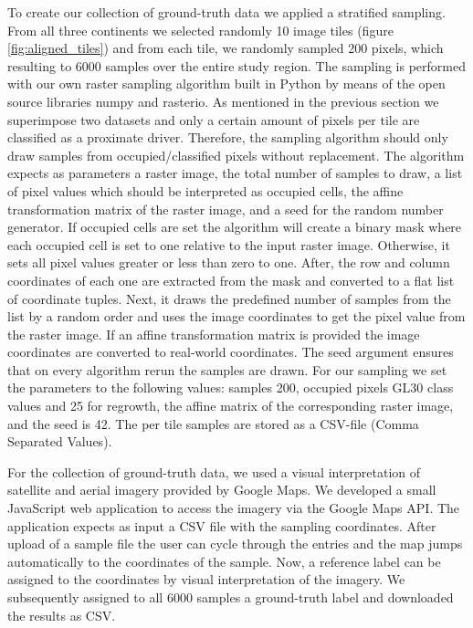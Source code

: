 			To create our collection of ground-truth data we applied a stratified sampling. From all three continents we selected randomly 10 image tiles (figure \ref{fig:aligned_tiles}) and from each tile, we randomly sampled 200 pixels, which resulting to 6000 samples over the entire study region. The sampling is performed with our own raster sampling algorithm built in Python by means of the open source libraries numpy and rasterio. As mentioned in the previous section we superimpose two datasets and only a certain amount of pixels per tile are classified as a proximate driver. Therefore, the sampling algorithm should only draw samples from occupied/classified pixels without replacement. The algorithm expects as parameters a raster image, the total number of samples to draw, a list of pixel values which should be interpreted as occupied cells, the affine transformation matrix of the raster image, and a seed for the random number generator. If occupied cells are set the algorithm will create a binary mask where each occupied cell is set to one relative to the input raster image. Otherwise, it sets all pixel values greater or less than zero to one. After, the row and column coordinates of each one are extracted from the mask and converted to a flat list of coordinate tuples. Next, it draws the predefined number of samples from the list by a random order and uses the image coordinates to get the pixel value from the raster image. If an affine transformation matrix is provided the image coordinates are converted to real-world coordinates. The seed argument ensures that on every algorithm rerun the samples are drawn. For our sampling we set the parameters to the following values: samples 200, occupied pixels \ac{GL30} class values and 25 for regrowth, the affine matrix of the corresponding raster image, and the seed is 42. The per tile samples are stored as a CSV-file (Comma Separated Values).

			For the collection of ground-truth data, we used a visual interpretation of satellite and aerial imagery provided by Google Maps. We developed a small JavaScript web application to access the imagery via the Google Maps \ac{API}. The application expects as input a CSV file with the sampling coordinates. After upload of a sample file the user can cycle through the entries and the map jumps automatically to the coordinates of the sample. Now, a reference label can be assigned to the coordinates by visual interpretation of the imagery. We subsequently assigned to all 6000 samples a ground-truth label and downloaded the results as CSV.

